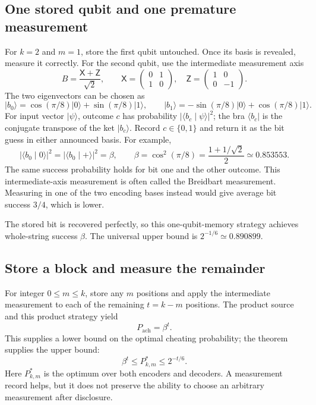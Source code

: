 \documentclass[11pt,a4paper]{article}
\newcommand{\ket}[1]{\lvert #1\rangle}
\newcommand{\bra}[1]{\langle #1\rvert}
\newcommand{\ip}[2]{\langle #1\mid #2\rangle}
\newcommand{\XX}{\mathsf X}
\newcommand{\ZZ}{\mathsf Z}
\begin{document}
\subsection{One stored qubit and one premature measurement}
For $k=2$ and $m=1$, store the first qubit untouched. Once its basis is revealed, measure it correctly. For the second qubit, use the intermediate measurement axis
\[
B=\frac{\XX+\ZZ}{\sqrt2},\qquad
\XX=\begin{pmatrix}0&1\\1&0\end{pmatrix},\quad
\ZZ=\begin{pmatrix}1&0\\0&-1\end{pmatrix}.
\]
The two eigenvectors can be chosen as
\[
\ket{b_0}=\cos(\pi/8)\ket0+\sin(\pi/8)\ket1,\qquad
\ket{b_1}=-\sin(\pi/8)\ket0+\cos(\pi/8)\ket1.
\]
For input vector $\ket\psi$, outcome $c$ has probability $|\ip{b_c}{\psi}|^2$; the bra $\bra{b_c}$ is the conjugate transpose of the ket $\ket{b_c}$. Record $c\in\{0,1\}$ and return it as the bit guess in either announced basis. For example,
\[
|\ip{b_0}{0}|^2=|\ip{b_0}{+}|^2
=\beta,\qquad
\beta=\cos^2(\pi/8)=\frac{1+1/\sqrt2}{2}\simeq0.853553.
\]
The same success probability holds for bit one and the other outcome. This intermediate-axis measurement is often called the Breidbart measurement. Measuring in one of the two encoding bases instead would give average bit success $3/4$, which is lower.

The stored bit is recovered perfectly, so this one-qubit-memory strategy achieves whole-string success $\beta$. The universal upper bound is $2^{-1/6}\simeq0.890899$.

\subsection{Store a block and measure the remainder}
For integer $0\leq m\leq k$, store any $m$ positions and apply the intermediate measurement to each of the remaining $t=k-m$ positions. The product source and this product strategy yield
\begin{equation}\label{eq:witness}
P_{\mathrm{ach}}=\beta^t.
\end{equation}
This supplies a lower bound on the optimal cheating probability; the theorem supplies the upper bound:
\begin{equation}\label{eq:bracket}
\beta^t\leq P^*_{k,m}\leq2^{-t/6}.
\end{equation}
Here $P^*_{k,m}$ is the optimum over both encoders and decoders. A measurement record helps, but it does not preserve the ability to choose an arbitrary measurement after disclosure.
\end{document}
